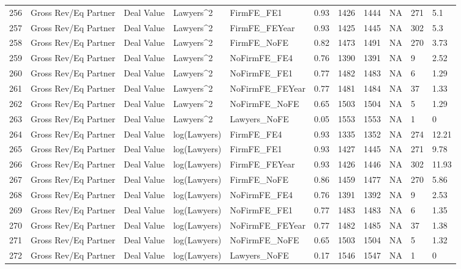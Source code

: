 \begin{table}[ht]
\begin{tabular}{rllllllllll}
  256 & Gross Rev/Eq Partner & Deal Value & Lawyers^2 & FirmFE\_FE1 & 0.93 & 1426 & 1444 & NA & 271 & 5.1 \\ 
  257 & Gross Rev/Eq Partner & Deal Value & Lawyers^2 & FirmFE\_FEYear & 0.93 & 1425 & 1445 & NA & 302 & 5.3 \\ 
  258 & Gross Rev/Eq Partner & Deal Value & Lawyers^2 & FirmFE\_NoFE & 0.82 & 1473 & 1491 & NA & 270 & 3.73 \\ 
  259 & Gross Rev/Eq Partner & Deal Value & Lawyers^2 & NoFirmFE\_FE4 & 0.76 & 1390 & 1391 & NA & 9 & 2.52 \\ 
  260 & Gross Rev/Eq Partner & Deal Value & Lawyers^2 & NoFirmFE\_FE1 & 0.77 & 1482 & 1483 & NA & 6 & 1.29 \\ 
  261 & Gross Rev/Eq Partner & Deal Value & Lawyers^2 & NoFirmFE\_FEYear & 0.77 & 1481 & 1484 & NA & 37 & 1.33 \\ 
  262 & Gross Rev/Eq Partner & Deal Value & Lawyers^2 & NoFirmFE\_NoFE & 0.65 & 1503 & 1504 & NA & 5 & 1.29 \\ 
  263 & Gross Rev/Eq Partner & Deal Value & Lawyers^2 & Lawyers\_NoFE & 0.05 & 1553 & 1553 & NA & 1 & 0 \\ 
  264 & Gross Rev/Eq Partner & Deal Value & log(Lawyers) & FirmFE\_FE4 & 0.93 & 1335 & 1352 & NA & 274 & 12.21 \\ 
  265 & Gross Rev/Eq Partner & Deal Value & log(Lawyers) & FirmFE\_FE1 & 0.93 & 1427 & 1445 & NA & 271 & 9.78 \\ 
  266 & Gross Rev/Eq Partner & Deal Value & log(Lawyers) & FirmFE\_FEYear & 0.93 & 1426 & 1446 & NA & 302 & 11.93 \\ 
  267 & Gross Rev/Eq Partner & Deal Value & log(Lawyers) & FirmFE\_NoFE & 0.86 & 1459 & 1477 & NA & 270 & 5.86 \\ 
  268 & Gross Rev/Eq Partner & Deal Value & log(Lawyers) & NoFirmFE\_FE4 & 0.76 & 1391 & 1392 & NA & 9 & 2.53 \\ 
  269 & Gross Rev/Eq Partner & Deal Value & log(Lawyers) & NoFirmFE\_FE1 & 0.77 & 1483 & 1483 & NA & 6 & 1.35 \\ 
  270 & Gross Rev/Eq Partner & Deal Value & log(Lawyers) & NoFirmFE\_FEYear & 0.77 & 1482 & 1485 & NA & 37 & 1.38 \\ 
  271 & Gross Rev/Eq Partner & Deal Value & log(Lawyers) & NoFirmFE\_NoFE & 0.65 & 1503 & 1504 & NA & 5 & 1.32 \\ 
  272 & Gross Rev/Eq Partner & Deal Value & log(Lawyers) & Lawyers\_NoFE & 0.17 & 1546 & 1547 & NA & 1 & 0 \\ 

\end{tabular}
\end{table}
